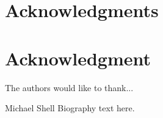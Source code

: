 \documentclass[12pt,journal,compsoc]{IEEEtran}
\begin{document}
  \section*{Acknowledgments}
\else
  \section*{Acknowledgment}
\fi


The authors would like to thank...


\ifCLASSOPTIONcaptionsoff
  \newpage
\fi





%
%
%




% 

\begin{IEEEbiography}{Michael Shell}
Biography text here.
\end{IEEEbiography}
\end{document}
